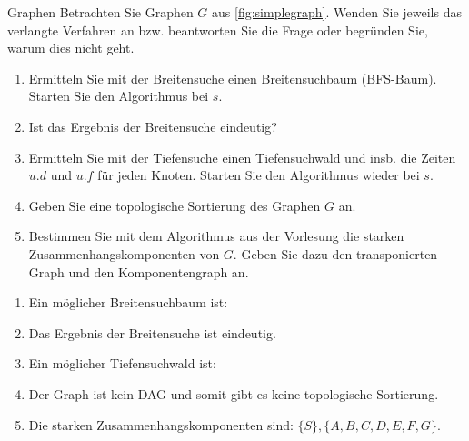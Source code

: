 \documentclass{article}
\begin{document}
\begin{exercise}{Graphen}
  Betrachten Sie Graphen $G$ aus \ref{fig:simplegraph}. Wenden Sie jeweils das verlangte Verfahren an bzw. beantworten Sie die Frage oder begründen Sie, warum dies nicht geht.
  
  \begin{enumerate}
    \item Ermitteln Sie mit der Breitensuche einen Breitensuchbaum (BFS-Baum). Starten Sie den Algorithmus bei $s$.
    \item Ist das Ergebnis der Breitensuche eindeutig?
    \item Ermitteln Sie mit der Tiefensuche einen Tiefensuchwald und insb. die Zeiten $u.d$ und $u.f$ für jeden Knoten. Starten Sie den Algorithmus wieder bei $s$.
    \item Geben Sie eine topologische Sortierung des Graphen $G$ an.
    \item Bestimmen Sie mit dem Algorithmus aus der Vorlesung die starken Zusammenhangskomponenten von $G$. Geben Sie dazu den transponierten Graph und den Komponentengraph an.
  \end{enumerate}

  \begin{solution}
    \begin{enumerate}
      \item Ein möglicher Breitensuchbaum ist: 
      \item Das Ergebnis der Breitensuche ist eindeutig.
      \item Ein möglicher Tiefensuchwald ist: 
      \item Der Graph ist kein DAG und somit gibt es keine topologische Sortierung.
      \item Die starken Zusammenhangskomponenten sind: $\{S\}, \{A, B, C, D, E, F, G\}$. 
    \end{enumerate}
  \end{solution}
\end{exercise}
\end{document}
